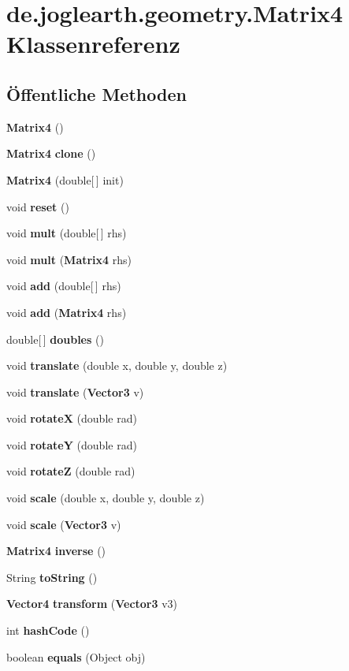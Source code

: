 \section{de.\-joglearth.\-geometry.\-Matrix4 Klassenreferenz}
\label{classde_1_1joglearth_1_1geometry_1_1_matrix4}
\subsection*{Öffentliche Methoden}
\begin{DoxyCompactItemize}
\item 
{\bf Matrix4} ()
\item 
{\bf Matrix4} {\bf clone} ()
\item 
{\bf Matrix4} (double[$\,$] init)
\item 
void {\bf reset} ()
\item 
void {\bf mult} (double[$\,$] rhs)
\item 
void {\bf mult} ({\bf Matrix4} rhs)
\item 
void {\bf add} (double[$\,$] rhs)
\item 
void {\bf add} ({\bf Matrix4} rhs)
\item 
double[$\,$] {\bf doubles} ()
\item 
void {\bf translate} (double x, double y, double z)
\item 
void {\bf translate} ({\bf Vector3} v)
\item 
void {\bf rotate\-X} (double rad)
\item 
void {\bf rotate\-Y} (double rad)
\item 
void {\bf rotate\-Z} (double rad)
\item 
void {\bf scale} (double x, double y, double z)
\item 
void {\bf scale} ({\bf Vector3} v)
\item 
{\bf Matrix4} {\bf inverse} ()
\item 
String {\bf to\-String} ()
\item 
{\bf Vector4} {\bf transform} ({\bf Vector3} v3)
\item 
int {\bfseries hash\-Code} ()\label{classde_1_1joglearth_1_1geometry_1_1_matrix4_a7299aaf8de4c8734194fe0573c5976d2}

\item 
boolean {\bfseries equals} (Object obj)\label{classde_1_1joglearth_1_1geometry_1_1_matrix4_a607b1abe61ca18c63b9a794fb95f1207}

\end{DoxyCompactItemize}


